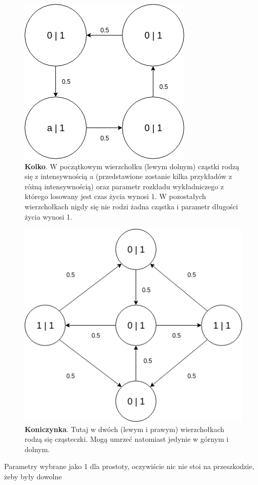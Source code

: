\documentclass{article}
\begin{document}
\begin{figure}[h!]
\centering
\includegraphics[width=0.6\linewidth]{kolko}
\caption{\textbf{Kolko}. W początkowym wierzchołku (lewym dolnym) cząstki rodzą się z intensywnością a (przedstawione zostanie kilka przykładów z różną intensywnością) oraz parametr rozkładu wykładniczego z którego losowany jest czas życia wynosi 1. W pozostałych wierzchołkach nigdy się nie rodzi żadna cząstka i parametr długości życia wynosi 1.}
\end{figure}

\begin{figure}[h!]
\centering
\includegraphics[width=0.6\linewidth]{koniczynka}
\caption{\textbf{Koniczynka}. Tutaj w dwóch (lewym i prawym) wierzchołkach rodzą się cząsteczki. Mogą umrzeć natomiast jedynie w górnym i dolnym.}
\end{figure}
Parametry wybrane jako 1 dla prostoty, oczywiście nic nie stoi na przeszkodzie, żeby były dowolne\newpage
\end{document}
